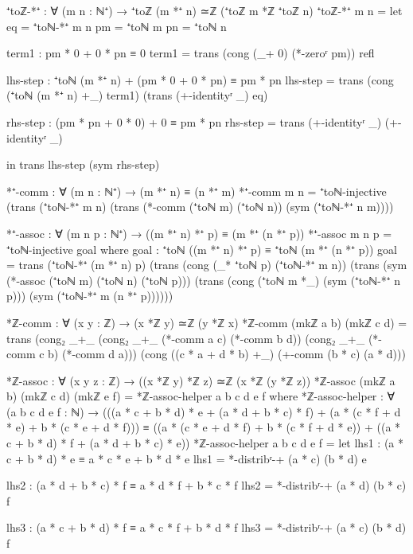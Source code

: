 \documentclass[11pt,a4paper]{book}
\begin{document}
\begin{code}
⁺toℤ-*⁺ : ∀ (m n : ℕ⁺) → ⁺toℤ (m *⁺ n) ≃ℤ (⁺toℤ m *ℤ ⁺toℤ n)
⁺toℤ-*⁺ m n = 
  let eq = ⁺toℕ-*⁺ m n
      pm = ⁺toℕ m
      pn = ⁺toℕ n
      
      term1 : pm * 0 + 0 * pn ≡ 0
      term1 = trans (cong (_+ 0) (*-zeroʳ pm)) refl
      
      lhs-step : ⁺toℕ (m *⁺ n) + (pm * 0 + 0 * pn) ≡ pm * pn
      lhs-step = trans (cong (⁺toℕ (m *⁺ n) +_) term1) 
                       (trans (+-identityʳ _) eq)
                       
      rhs-step : (pm * pn + 0 * 0) + 0 ≡ pm * pn
      rhs-step = trans (+-identityʳ _) (+-identityʳ _)
      
  in trans lhs-step (sym rhs-step)


*⁺-comm : ∀ (m n : ℕ⁺) → (m *⁺ n) ≡ (n *⁺ m)
*⁺-comm m n = ⁺toℕ-injective (trans (⁺toℕ-*⁺ m n) (trans (*-comm (⁺toℕ m) (⁺toℕ n)) (sym (⁺toℕ-*⁺ n m))))

*⁺-assoc : ∀ (m n p : ℕ⁺) → ((m *⁺ n) *⁺ p) ≡ (m *⁺ (n *⁺ p))
*⁺-assoc m n p = ⁺toℕ-injective goal
  where
    goal : ⁺toℕ ((m *⁺ n) *⁺ p) ≡ ⁺toℕ (m *⁺ (n *⁺ p))
    goal = trans (⁺toℕ-*⁺ (m *⁺ n) p)
           (trans (cong (_* ⁺toℕ p) (⁺toℕ-*⁺ m n))
           (trans (sym (*-assoc (⁺toℕ m) (⁺toℕ n) (⁺toℕ p)))
           (trans (cong (⁺toℕ m *_) (sym (⁺toℕ-*⁺ n p)))
                  (sym (⁺toℕ-*⁺ m (n *⁺ p))))))

*ℤ-comm : ∀ (x y : ℤ) → (x *ℤ y) ≃ℤ (y *ℤ x)
*ℤ-comm (mkℤ a b) (mkℤ c d) = 
  trans (cong₂ _+_ (cong₂ _+_ (*-comm a c) (*-comm b d)) 
                   (cong₂ _+_ (*-comm c b) (*-comm d a)))
        (cong ((c * a + d * b) +_) (+-comm (b * c) (a * d)))

*ℤ-assoc : ∀ (x y z : ℤ) → ((x *ℤ y) *ℤ z) ≃ℤ (x *ℤ (y *ℤ z))
*ℤ-assoc (mkℤ a b) (mkℤ c d) (mkℤ e f) =
  *ℤ-assoc-helper a b c d e f
  where
    *ℤ-assoc-helper : ∀ (a b c d e f : ℕ) →
      (((a * c + b * d) * e + (a * d + b * c) * f) + (a * (c * f + d * e) + b * (c * e + d * f)))
      ≡ ((a * (c * e + d * f) + b * (c * f + d * e)) + ((a * c + b * d) * f + (a * d + b * c) * e))
    *ℤ-assoc-helper a b c d e f = 
      let 
        lhs1 : (a * c + b * d) * e ≡ a * c * e + b * d * e
        lhs1 = *-distribʳ-+ (a * c) (b * d) e
        
        lhs2 : (a * d + b * c) * f ≡ a * d * f + b * c * f
        lhs2 = *-distribʳ-+ (a * d) (b * c) f
        
        lhs3 : (a * c + b * d) * f ≡ a * c * f + b * d * f
        lhs3 = *-distribʳ-+ (a * c) (b * d) f
        

\end{code}
\end{document}
